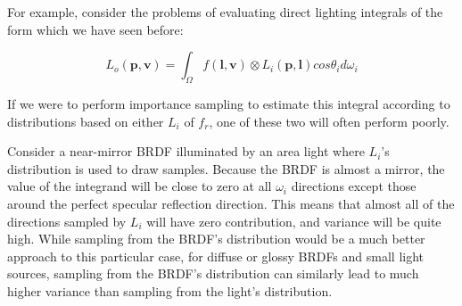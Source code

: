 For example, consider the problems of evaluating direct lighting integrals of the form which we have seen before:

\begin{equation}
	L_o(\mathbf{p},\mathbf{v})=\int_{\Omega}f(\mathbf{l},\mathbf{v})\otimes L_i(\mathbf{p},\mathbf{l})cos\theta_i d\omega_i
\end{equation}

If we were to perform importance sampling to estimate this integral according to distributions based on either $L_i$ of $f_r$, one of these two will often perform poorly.

Consider a near-mirror BRDF illuminated by an area light where $L_i$'s distribution is used to draw samples. Because the BRDF is almost a mirror, the value of the integrand will be close to zero at all $\omega_i$ directions except those around the perfect specular reflection direction. This means that almost all of the directions sampled by $L_i$ will have zero contribution, and variance will be quite high. While sampling from the BRDF's distribution would be a much better approach to this particular case, for diffuse or glossy BRDFs and small light sources, sampling from the BRDF's distribution can similarly lead to much higher variance than sampling from the light's distribution.


